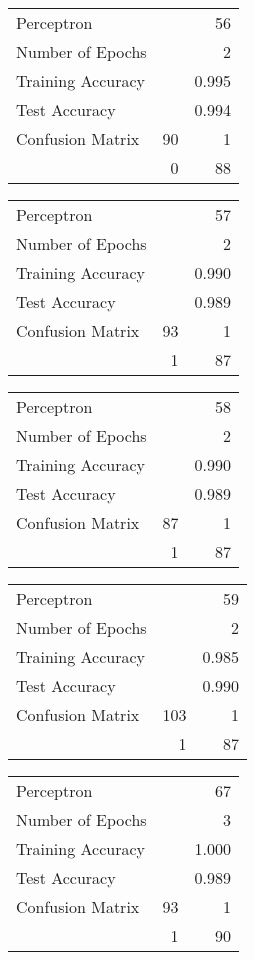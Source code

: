 \documentclass[11pt,twocolumn]{article}
\begin{document}
\begin{center}
\begin{tabular}{l | r r}
Perceptron &&56\\
Number of Epochs & &2\\
Training Accuracy & &0.995\\
Test Accuracy & &0.994\\
Confusion Matrix &90 & 1\\
 &0 & 88\\
\end{tabular}
\end{center}
\begin{center}
\begin{tabular}{l | r r}
Perceptron &&57\\
Number of Epochs & &2\\
Training Accuracy & &0.990\\
Test Accuracy & &0.989\\
Confusion Matrix &93 & 1\\
 &1 & 87\\
\end{tabular}
\end{center}
\begin{center}
\begin{tabular}{l | r r}
Perceptron &&58\\
Number of Epochs & &2\\
Training Accuracy & &0.990\\
Test Accuracy & &0.989\\
Confusion Matrix &87 & 1\\
 &1 & 87\\
\end{tabular}
\end{center}
\begin{center}
\begin{tabular}{l | r r}
Perceptron &&59\\
Number of Epochs & &2\\
Training Accuracy & &0.985\\
Test Accuracy & &0.990\\
Confusion Matrix &103 & 1\\
 &1 & 87\\
\end{tabular}
\end{center}
\begin{center}
\begin{tabular}{l | r r}
Perceptron &&67\\
Number of Epochs & &3\\
Training Accuracy & &1.000\\
Test Accuracy & &0.989\\
Confusion Matrix &93 & 1\\
 &1 & 90\\
\end{tabular}
\end{center}
\end{document}
